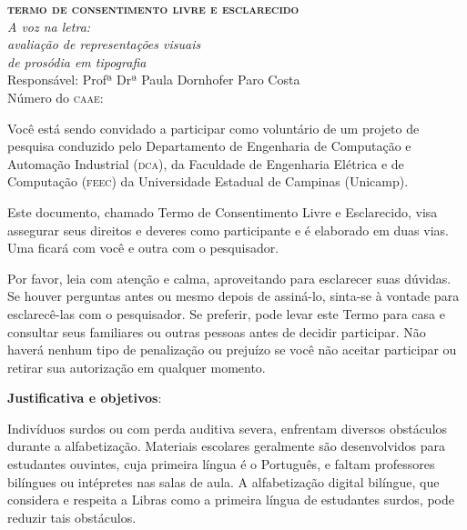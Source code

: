 \documentclass[a4paper,11pt,titlepage,singlespacing]{article}
\begin{document}


	\begin{center}
		\textbf{\Large{\textsc{termo de consentimento livre e esclarecido}}}\\
        \vspace{5pt}
        \huge\textit{A voz na letra: \\ avaliação de representações visuais \\ de prosódia em tipografia}\\
        \vspace{20pt}
        \large{Responsável: Profª Drª Paula Dornhofer Paro Costa}\\
        \vspace{10pt}
        Número do \textsc{caae}: \\
        \vspace{15pt}
	\end{center}

\noindent Você está sendo convidado a participar como voluntário de um projeto de pesquisa conduzido pelo Departamento de Engenharia de Computação e Automação Industrial (\textsc{dca}), da Faculdade de Engenharia Elétrica e de Computação (\textsc{feec}) da Universidade Estadual de Campinas (Unicamp).

Este documento, chamado Termo de Consentimento Livre e Esclarecido, visa assegurar seus direitos e deveres como participante e é elaborado em duas vias. Uma ficará com você e outra com o pesquisador.

Por favor, leia com atenção e calma, aproveitando para esclarecer suas dúvidas. Se houver perguntas antes ou mesmo depois de assiná-lo, sinta-se à vontade para esclarecê-las com o pesquisador. Se preferir, pode levar este Termo para casa e consultar seus familiares ou outras pessoas antes de decidir participar. Não haverá nenhum tipo de penalização ou prejuízo se você não aceitar participar ou retirar sua
autorização em qualquer momento.

\vspace{10pt}
\textbf{Justificativa e objetivos}:

Indivíduos surdos ou com perda auditiva severa, enfrentam diversos obstáculos durante a alfabetização. Materiais escolares geralmente são desenvolvidos para estudantes ouvintes, cuja primeira língua é o Português, e faltam professores bilíngues ou intépretes nas salas de aula. A alfabetização digital bilíngue, que considera e respeita a Libras como a primeira língua de estudantes surdos, pode reduzir tais obstáculos.
\end{document}
